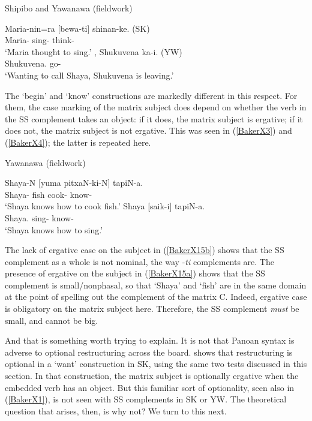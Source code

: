 \documentclass[output=paper]{langscibook}
\begin{document}
\begin{exe}
\ex Shipibo and Yawanawa (fieldwork) \label{BakerX14}
    \begin{xlist}
    \ex \label{BakerX14a}
		\gll Maria-nin=ra [bewa-ti] shinan-ke. (SK)\\
			 Maria- sing- think-\\
		    \glt `Maria thought to sing.'
	\ex \label{BakerX14b}
		, Shukuvena ka-i. (YW)\\
			 [(he) Shaya call-\sc{des-ss.nom}] Shukuvena. go-\\
		    \glt `Wanting to call Shaya, Shukuvena is leaving.'
    \end{xlist}
\end{exe}

The `begin' and `know' constructions are markedly different in this respect. For them, the case marking of the matrix subject does depend on whether the verb in the SS complement takes an object: if it does, the matrix subject is ergative; if it does not, the matrix subject is not ergative. This was seen in (\ref{BakerX3}) and (\ref{BakerX4}); the latter is repeated here.

\begin{exe}
\ex Yawanawa (fieldwork) \label{BakerX15}
    \begin{xlist}
		\ex \label{BakerX15a}
		\gll Shaya-N [yuma pitxaN-ki-N] tapiN-a.\\
		     Shaya- fish cook- know-\\
		    \glt `Shaya knows how to cook fish.'
		\ex \label{BakerX15b}
		\gll Shaya [saik-i] tapiN-a.\\
			 Shaya. sing- know-\\
		    \glt `Shaya knows how to sing.'
	\end{xlist}
\end{exe}


The lack of ergative case on the subject in (\ref{BakerX15b}) shows that the SS complement as a whole is not nominal, the way -\textit{ti} complements are. The presence of ergative on the subject in (\ref{BakerX15a}) shows that the SS complement is small/nonphasal, so that ‘Shaya’ and ‘fish’ are in the same domain at the point of spelling out the complement of the matrix C. Indeed, ergative case is obligatory on the matrix subject here. Therefore, the SS complement \textit{must} be small, and cannot be big.

And that is something worth trying to explain. It is not that Panoan syntax is adverse to optional restructuring across the board. \citet[371--376]{Baker14} shows that restructuring is optional in a ‘want’ construction in SK, using the same two tests discussed in this section. In that construction, the matrix subject is optionally ergative when the embedded verb has an object. But this familiar sort of optionality, seen also in (\ref{BakerX1}), is not seen with SS complements in SK or YW. The theoretical question that arises, then, is why not? We turn to this next.
\end{document}
